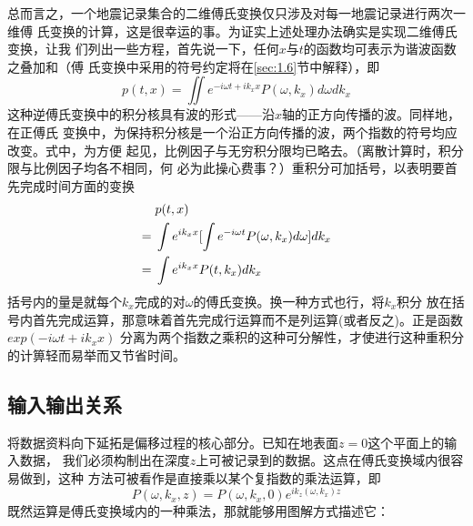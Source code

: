 总而言之，一个地震记录集合的二维傅氏变换仅只涉及对每一地震记录进行两次一维傅
氏变换的计算，这是很幸运的事。为证实上述处理办法确实是实现二维傅氏变换，让我
们列出一些方程，首先说一下，任何$x$与$t$的函数均可表示为谐波函数之叠加和（傅
氏变换中采用的符号约定将在\ref{sec:1.6}节中解释），即
\begin{equation}
p(t,x) = \iint e^{-i\omega t+ik_{x}x}P(\omega,k_{x})d\omega dk_{x}
\label{eq:ex1.2.9}
\end{equation}
这种逆傅氏变换中的积分核具有波的形式——沿$x$轴的正方向传播的波。同样地，在正傅氏
变换中，为保持积分核是一个沿正方向传播的波，两个指数的符号均应改变。式中，为方便
起见，比例因子与无穷积分限均已略去。（离散计算时，积分限与比例因子均各不相同，何
必为此操心费事？）重积分可加括号，以表明要首先完成时间方面的变换
\begin{align*}
   & p(t,x) \notag \\
={}& \int e^{ik_{x}x}[\int e^{-i\omega t}P(\omega,k_{x})d\omega]dk_{x} \notag \\
={}& \int e^{ik_{x}x}P(t,k_{x})dk_{x} \notag
\end{align*}
括号内的量是就每个$k_{x}$完成的对$\omega$的傅氏变换。换一种方式也行，将$k_{x}$积分
放在括号内首先完成运算，那意味着首先完成行运算而不是列运算(或者反之)。正是函数$exp(-i\omega t+ik_{x}x)$
分离为两个指数之乘积的这种可分解性，才使进行这种重积分的计箅轻而易举而又节省时间。

\subsection{输入输出关系}
\label{sec:1.2.5}

将数据资料向下延拓是偏移过程的核心部分。已知在地表面$z=0$这个平面上的输入数据，
我们必须构制出在深度$z$上可被记录到的数据。这点在傅氏变换域内很容易做到，这种
方法可被看作是直接乘以某个复指数的乘法运算，即
\begin{equation}
P(\omega,k_{x},z) = P(\omega,k_{x},0)e^{ik_{z}(\omega,k_{x})z}
\label{eq:ex1.2.10}
\end{equation}
既然运算是傅氏变换域内的一种乘法，那就能够用图解方式描述它：


